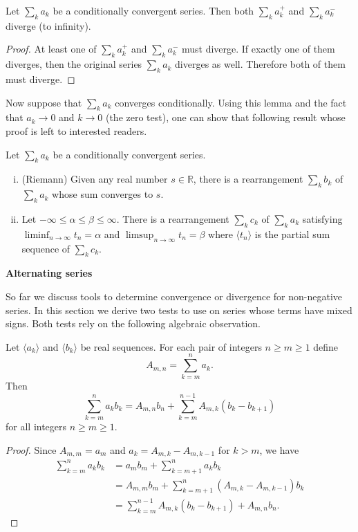 \documentclass[11pt]{article}
\begin{document}
\begin{lem}
  Let $\sum_k a_k$ be a conditionally convergent series.
  Then both $\sum_k a_k^+$ and $\sum_k a_k^-$ diverge (to infinity).
\end{lem}

\begin{proof}
  At least one of $\sum_k a_k^+$ and $\sum_k a_k^-$ must diverge.
  If exactly one of them diverges, then the original series $\sum_k a_k$ diverges as well.
  Therefore both of them must diverge.
\end{proof}

Now suppose that $\sum_k a_k$ converges conditionally.
Using this lemma and the fact that $a_k \to 0$ and $k \to 0$ (the zero test), one can show that following result whose proof is left to interested readers.

\begin{thm}
  Let $\sum_k a_k$ be a conditionally convergent series.
  \begin{enumerate}[(i)]
    \item (Riemann) Given any real number $s \in \mathbb{R}$, there is a rearrangement $\sum_k b_k$ of $\sum_k a_k$ whose sum converges to $s$.

    \item Let $-\infty \leqslant \alpha \leqslant \beta \leqslant \infty$.
      There is a rearrangement $\sum_k c_k$ of $\sum_k a_k$ satisfying $\liminf_{n \to \infty} t_n = \alpha$ and $\limsup_{n \to \infty} t_n = \beta$ where $\langle t_n \rangle$ is the partial sum sequence of $\sum_k c_k$.
  \end{enumerate}
\end{thm}

\medskip
\noindent\textbf{\large Alternating series}

So far we discuss tools to determine convergence or divergence for non-negative series.
In this section we derive two tests to use on series whose terms have mixed signs.
Both tests rely on the following algebraic observation.

\begin{thm}
  Let $\langle a_k \rangle$ and $\langle b_k \rangle$ be real sequences.
  For each pair of integers $n \geqslant m \geqslant 1$ define
  \[
    A_{m,n} = \sum_{k=m}^n a_k.
  \]
  Then
  \[
    \sum_{k=m}^n a_k b_k = A_{m,n} b_n + \sum_{k=m}^{n-1} A_{m,k} (b_k - b_{k+1})
  \]
  for all integers $n \geqslant m \geqslant 1$.
\end{thm}

\begin{proof}
  Since $A_{m,m} = a_m$ and $a_k = A_{m,k} - A_{m,k-1}$ for $k > m$, we have
  \begin{align*}
    \sum_{k=m}^n a_k b_k &= a_m b_m + \sum_{k=m+1}^n a_k b_k \\
    &= A_{m,m} b_m + \sum_{k=m+1}^n (A_{m,k} - A_{m,k-1}) b_k \\
    &= \sum_{k=m}^{n-1} A_{m,k} (b_k - b_{k+1}) + A_{m,n} b_n. 
  \end{align*}
\end{proof}
\end{document}

